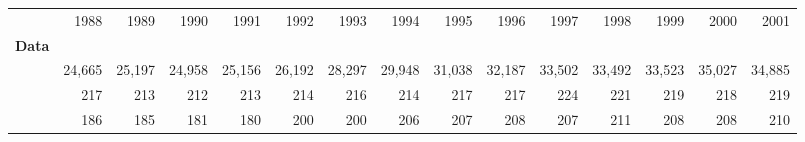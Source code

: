 \begin{tabular}{lllllllllllllll}
\cline{1-15}
\multicolumn{1}{c}{} &
  \multicolumn{1}{|r}{1988} &
  \multicolumn{1}{r}{1989} &
  \multicolumn{1}{r}{1990} &
  \multicolumn{1}{r}{1991} &
  \multicolumn{1}{r}{1992} &
  \multicolumn{1}{r}{1993} &
  \multicolumn{1}{r}{1994} &
  \multicolumn{1}{r}{1995} &
  \multicolumn{1}{r}{1996} &
  \multicolumn{1}{r}{1997} &
  \multicolumn{1}{r}{1998} &
  \multicolumn{1}{r}{1999} &
  \multicolumn{1}{r}{2000} &
  \multicolumn{1}{r}{2001} \\
\cline{1-15}
\multicolumn{1}{l}{\textbf{Data}} &
  \multicolumn{1}{|r}{} &
  \multicolumn{1}{r}{} &
  \multicolumn{1}{r}{} &
  \multicolumn{1}{r}{} &
  \multicolumn{1}{r}{} &
  \multicolumn{1}{r}{} &
  \multicolumn{1}{r}{} &
  \multicolumn{1}{r}{} &
  \multicolumn{1}{r}{} &
  \multicolumn{1}{r}{} &
  \multicolumn{1}{r}{} &
  \multicolumn{1}{r}{} &
  \multicolumn{1}{r}{} &
  \multicolumn{1}{r}{} \\ \hline
\multicolumn{1}{l}{\hspace{1em}{$\#$ obs.}} &
  \multicolumn{1}{|r}{24,665} &
  \multicolumn{1}{r}{25,197} &
  \multicolumn{1}{r}{24,958} &
  \multicolumn{1}{r}{25,156} &
  \multicolumn{1}{r}{26,192} &
  \multicolumn{1}{r}{28,297} &
  \multicolumn{1}{r}{29,948} &
  \multicolumn{1}{r}{31,038} &
  \multicolumn{1}{r}{32,187} &
  \multicolumn{1}{r}{33,502} &
  \multicolumn{1}{r}{33,492} &
  \multicolumn{1}{r}{33,523} &
  \multicolumn{1}{r}{35,027} &
  \multicolumn{1}{r}{34,885} \\
\multicolumn{1}{l}{\hspace{1em}{$\#$ sectors}} &
  \multicolumn{1}{|r}{217} &
  \multicolumn{1}{r}{213} &
  \multicolumn{1}{r}{212} &
  \multicolumn{1}{r}{213} &
  \multicolumn{1}{r}{214} &
  \multicolumn{1}{r}{216} &
  \multicolumn{1}{r}{214} &
  \multicolumn{1}{r}{217} &
  \multicolumn{1}{r}{217} &
  \multicolumn{1}{r}{224} &
  \multicolumn{1}{r}{221} &
  \multicolumn{1}{r}{219} &
  \multicolumn{1}{r}{218} &
  \multicolumn{1}{r}{219} \\
\multicolumn{1}{l}{\hspace{1em}{$\#$ origin countries}} &
  \multicolumn{1}{|r}{186} &
  \multicolumn{1}{r}{185} &
  \multicolumn{1}{r}{181} &
  \multicolumn{1}{r}{180} &
  \multicolumn{1}{r}{200} &
  \multicolumn{1}{r}{200} &
  \multicolumn{1}{r}{206} &
  \multicolumn{1}{r}{207} &
  \multicolumn{1}{r}{208} &
  \multicolumn{1}{r}{207} &
  \multicolumn{1}{r}{211} &
  \multicolumn{1}{r}{208} &
  \multicolumn{1}{r}{208} &
  \multicolumn{1}{r}{210} \\

\end{tabular}
